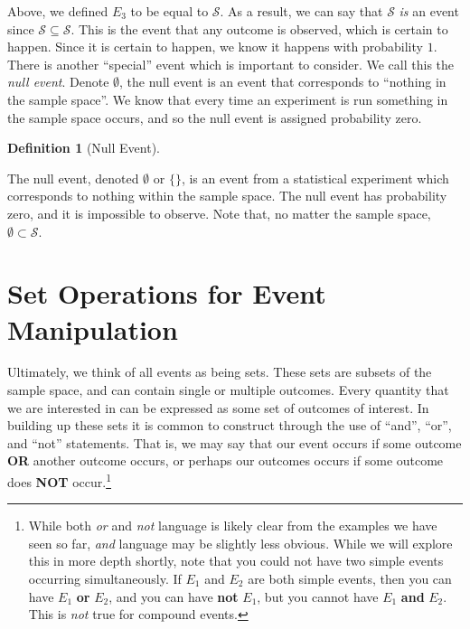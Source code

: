 \documentclass[
  letterpaper,
  DIV=11,
  numbers=noendperiod]{scrreprt}
\theoremstyle{definition}
\theoremstyle{definition}
\theoremstyle{definition}
\newtheorem{definition}{Definition}[chapter]
\theoremstyle{remark}
\begin{document}
Above, we defined \(E_3\) to be equal to \(\mathcal{S}\). As a result,
we can say that \(\mathcal{S}\) \emph{is} an event since
\(\mathcal{S} \subseteq \mathcal{S}\). This is the event that any
outcome is observed, which is certain to happen. Since it is certain to
happen, we know it happens with probability \(1\). There is another
``special'' event which is important to consider. We call this the
\emph{null event}. Denote \(\emptyset\), the null event is an event that
corresponds to ``nothing in the sample space''. We know that every time
an experiment is run something in the sample space occurs, and so the
null event is assigned probability zero.

\begin{definition}[Null
Event]\protect\hypertarget{def-null-event}{}\label{def-null-event}

The null event, denoted \(\emptyset\) or \(\{\}\), is an event from a
statistical experiment which corresponds to nothing within the sample
space. The null event has probability zero, and it is impossible to
observe. Note that, no matter the sample space,
\(\emptyset\subset\mathcal{S}\).

\end{definition}

\section{Set Operations for Event
Manipulation}\label{set-operations-for-event-manipulation}

Ultimately, we think of all events as being sets. These sets are subsets
of the sample space, and can contain single or multiple outcomes. Every
quantity that we are interested in can be expressed as some set of
outcomes of interest. In building up these sets it is common to
construct through the use of ``and'', ``or'', and ``not'' statements.
That is, we may say that our event occurs if some outcome \textbf{OR}
another outcome occurs, or perhaps our outcomes occurs if some outcome
does \textbf{NOT} occur.\footnote{While both \emph{or} and \emph{not}
  language is likely clear from the examples we have seen so far,
  \emph{and} language may be slightly less obvious. While we will
  explore this in more depth shortly, note that you could not have two
  simple events occurring simultaneously. If \(E_1\) and \(E_2\) are
  both simple events, then you can have \(E_1\) \textbf{or} \(E_2\), and
  you can have \textbf{not} \(E_1\), but you cannot have \(E_1\)
  \textbf{and} \(E_2\). This is \emph{not} true for compound events.}
\end{document}

